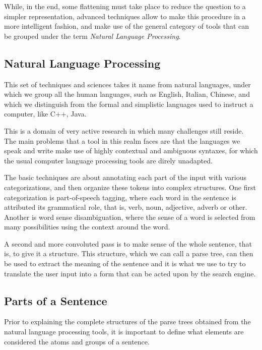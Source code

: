 While, in the end, some flattening must take place to reduce the question to a simpler representation, advanced techniques allow to make this procedure in a more intelligent fashion, and make use of the general category of tools that can be grouped under the term \emph{Natural Language Processing}.

\subsection{Natural Language Processing} %
\label{sub:natural_language_processing}

This set of techniques and sciences takes it name from natural languages, under which we group all the human languages, such as English, Italian, Chinese, and which we distinguish from the formal and simplistic languages used to instruct a computer, like C++, Java.

This is a domain of very active research in which many challenges still reside. The main problems that a tool in this realm faces are that the languages we speak and write make use of highly contextual and ambiguous syntaxes, for which the usual computer language processing tools are direly unadapted.

The basic techniques are about annotating each part of the input with various categorizations, and then organize these tokens into complex structures. One first categorization is part-of-speech tagging, where each word in the sentence is attributed its grammatical role, that is, verb, noun, adjective, adverb or other. Another is word sense disambiguation, where the sense of a word is selected from many possibilities using the context around the word.

A second and more convoluted pass is to make sense of the whole sentence, that is, to give it a structure. This structure, which we can call a parse tree, can then be used to extract the meaning of the sentence and it is what we use to try to translate the user input into a form that can be acted upon by the search engine.


\subsection{Parts of a Sentence} %
\label{sub:parts_of_a_sentence}

Prior to explaining the complete structures of the parse trees obtained from the natural language processing tools, it is important to define what elements are considered the atoms and groups of a sentence.

